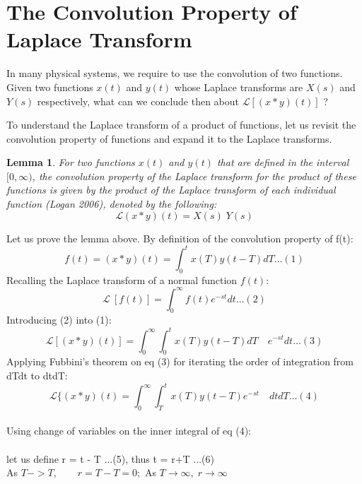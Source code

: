 \documentclass[12pt]{article}
\theoremstyle{plain}
\newtheorem{lemma}[theorem]{Lemma}
\theoremstyle{definition}
\begin{document}
\section{The Convolution Property of Laplace Transform}

In many physical systems, we require to use the convolution of two functions. Given two functions $x(t)$ and $y(t)$ whose Laplace transforms are $X(s)$ and $Y(s)$ respectively, what can we conclude then about $\mathcal{L}\left[{(x*y)(t)}\right]$ ?

To understand the Laplace transform of a product of functions, let us revisit the convolution property of functions and expand it to the Laplace transforms.
\\
\begin{lemma}
    For two functions $x(t)$ and $y(t)$ that are defined in the interval $[0,\infty)$, the convolution property of the Laplace transform for the product of these functions is given by the product of the Laplace transform of each individual function (Logan 2006), denoted by the following:
    \[
    \mathcal{L} (x*y) (t) = X(s) \; Y(s)
    \]
\end{lemma}
Let us prove the lemma above. By definition of the convolution property of f(t):
\begin{equation*} 
f(t) = (x * y) (t) = \int_{0}^{t} x(T) y(t-T) dT \dots (1)
\end{equation*}
Recalling the Laplace transform of a normal function $f(t)$:
\begin{equation*}
\mathcal{L}\ [f(t)] = \int_{0}^{\infty} f(t) e^{-st} dt \dots (2)
\end{equation*}
Introducing (2) into (1):
\begin{equation*}
\mathcal{L}\left[(x * y)(t)\right] = \int_{0}^{\infty}\int_{0}^{t} x(T) y(t-T) dT\quad e^{-st}  dt \dots (3)
\end{equation*}
Applying Fubbini's theorem on eq (3) for iterating the order of integration from dTdt to dtdT:
\begin{equation*}
\mathcal{L}\{(x * y) (t) = \int_{0}^{\infty}\int_{T}^{t} x(T) y(t-T) e^{-st}\quad dt dT\dots (4)
\end{equation*}
\\
Using change of variables on the inner integral of eq (4):\\
\\
let us define r = t - T $\dots$(5), \medskip thus t = r+T $\dots$(6) 
\\
As $T -> T,\qquad r= T-T = 0;$ \qquad \qquad \qquad As \; $T \to \infty, \; r \to \infty $
\end{document}
